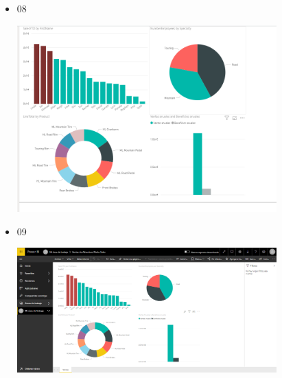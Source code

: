 \begin{itemize}
	\item 08
	\begin{center}
	\includegraphics[width=10cm]{./Imagenes/8} 
	\end{center}
\end{itemize} 

\begin{itemize}
	\item 09
	\begin{center}
	\includegraphics[width=10cm]{./Imagenes/9} 
	\end{center}
\end{itemize} 

